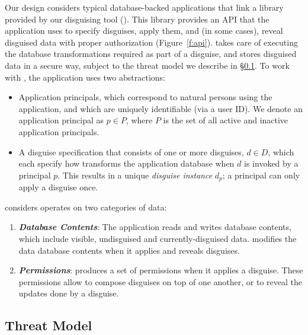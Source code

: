%
Our design considers typical database-backed applications that link a library provided by our disguising
tool (\sys).
%
This library provides an API that the application uses to specify disguises, apply them, and (in some
cases), reveal disguised data with proper authorization (Figure~\ref{f:api}).
%
\sys takes care of executing the database transformations required as part of a disguise, and stores
disguised data in a secure way, subject to the threat model we describe in \S\ref{s:threat}.
%
To work with \sys, the application uses two abstractions:
\begin{itemize}
    \item Application principals, which correspond to natural persons using the application, and
	which are uniquely identifiable (\eg via a user ID).
	We denote an application principal as $p \in P$, where $P$ is the set of all active and
	inactive application principals.
    \item A disguise specification that consists of one or more disguises, $d \in D$, which each specify
	how \sys transforms the application database when $d$ is invoked by a principal $p$.
	This results in a unique \emph{disguise instance} $d_p$; a principal can only apply a disguise
        once.
\end{itemize}
%
\sys considers operates on two categories of data:
\begin{enumerate}
    \item \emph{\textbf{Database Contents}}: The application reads and writes database
        contents, which include visible, undisguised and currently-disguised data.
        \sys modifies the data database contents when it applies and reveals disguises.
    \item \emph{\textbf{Permissions}}: \sys produces a set of permissions when it applies a
        disguise. These permissions allow \sys to compose disguises on top of one another, or to
        reveal the updates done by a disguise.
\end{enumerate}

\subsection{Threat Model}
\label{s:threat}


